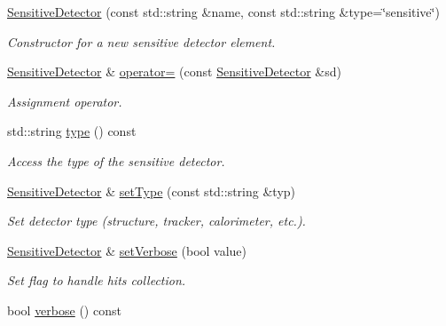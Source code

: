 \begin{DoxyCompactItemize}
\hyperlink{class_d_d4hep_1_1_geometry_1_1_sensitive_detector_a722d9ddcf488d7fc1c0fbe5772437cb1}{SensitiveDetector} (const std::string \&name, const std::string \&type=\char`\"{}sensitive\char`\"{})
\begin{DoxyCompactList}\small\item\em Constructor for a new sensitive detector element. \item\end{DoxyCompactList}\item 
\hyperlink{class_d_d4hep_1_1_geometry_1_1_sensitive_detector}{SensitiveDetector} \& \hyperlink{class_d_d4hep_1_1_geometry_1_1_sensitive_detector_a6119d874b9539c9c646641bd641209a5}{operator=} (const \hyperlink{class_d_d4hep_1_1_geometry_1_1_sensitive_detector}{SensitiveDetector} \&sd)
\begin{DoxyCompactList}\small\item\em Assignment operator. \item\end{DoxyCompactList}\item 
std::string \hyperlink{class_d_d4hep_1_1_geometry_1_1_sensitive_detector_ad68e2f554ff61e15b9b54e9f01713d41}{type} () const 
\begin{DoxyCompactList}\small\item\em Access the type of the sensitive detector. \item\end{DoxyCompactList}\item 
\hyperlink{class_d_d4hep_1_1_geometry_1_1_sensitive_detector}{SensitiveDetector} \& \hyperlink{class_d_d4hep_1_1_geometry_1_1_sensitive_detector_a1e0205afa22a576ecf2f5410d75fa952}{setType} (const std::string \&typ)
\begin{DoxyCompactList}\small\item\em Set detector type (structure, tracker, calorimeter, etc.). \item\end{DoxyCompactList}\item 
\hyperlink{class_d_d4hep_1_1_geometry_1_1_sensitive_detector}{SensitiveDetector} \& \hyperlink{class_d_d4hep_1_1_geometry_1_1_sensitive_detector_ae6c42b0c547eb06bddfd84c27a5b9e87}{setVerbose} (bool value)
\begin{DoxyCompactList}\small\item\em Set flag to handle hits collection. \item\end{DoxyCompactList}\item 
bool \hyperlink{class_d_d4hep_1_1_geometry_1_1_sensitive_detector_a20b5f96a1bfb953656cfa055bc3a48bc}{verbose} () const 

\end{DoxyCompactItemize}
